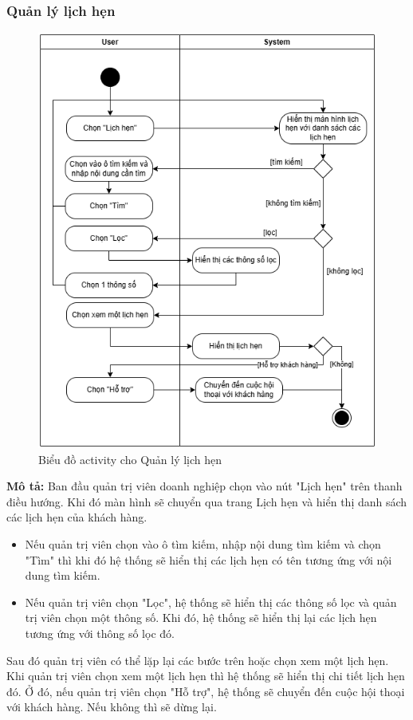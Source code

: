 \subsubsection{Quản lý lịch hẹn}
\begin{figure}[H]
    \centering
    \includegraphics[width=1\textwidth]{Dg_Activity/AppointmentManagement.png}
    \vspace{0.5cm}
    \caption{Biểu đồ activity cho Quản lý lịch hẹn}
    \label{fig:enter-label}
\end{figure}
\textbf{Mô tả:}
Ban đầu quản trị viên doanh nghiệp chọn vào nút "Lịch hẹn" trên thanh điều hướng. Khi đó màn hình sẽ chuyển qua trang Lịch hẹn và hiển thị danh sách các lịch hẹn của khách hàng.
\begin{itemize}
    \item Nếu quản trị viên chọn vào ô tìm kiếm, nhập nội dung tìm kiếm và chọn "Tìm" thì khi đó hệ thống sẽ hiển thị các lịch hẹn có tên tương ứng với nội dung tìm kiếm.
    \item Nếu quản trị viên chọn "Lọc", hệ thống sẽ hiển thị các thông số lọc và quản trị viên chọn một thông số. Khi đó, hệ thống sẽ hiển thị lại các lịch hẹn tương ứng với thông số lọc đó. 
\end{itemize}
Sau đó quản trị viên có thể lặp lại các bước trên hoặc chọn xem một lịch hẹn. Khi quản trị viên chọn xem một lịch hẹn thì hệ thống sẽ hiển thị chi tiết lịch hẹn đó. Ở đó, nếu quản trị viên chọn "Hỗ trợ", hệ thống sẽ chuyển đến cuộc hội thoại với khách hàng. Nếu không thì sẽ dừng lại.



